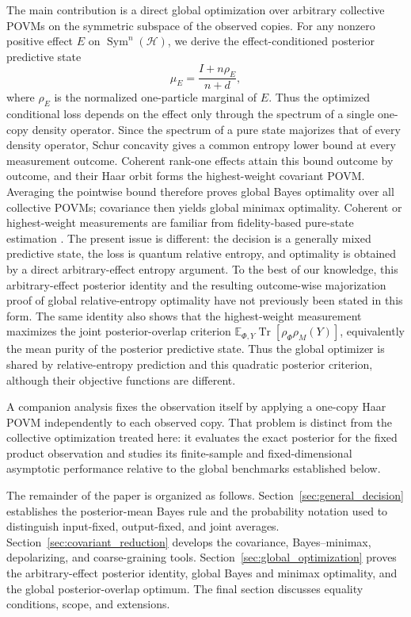 \documentclass[journal]{IEEEtran}
\begin{document}
The main contribution is a direct global optimization over arbitrary collective
POVMs on the symmetric subspace of the observed copies.  For any nonzero
positive effect \(E\) on \(\operatorname{Sym}^n(\mathcal H)\), we derive the
effect-conditioned posterior predictive state
\[
    \mu_E=\frac{I+n\rho_E}{n+d},
\]
where \(\rho_E\) is the normalized one-particle marginal of \(E\).  Thus the
optimized conditional loss depends on the effect only through the spectrum of
a single one-copy density operator.  Since the spectrum of a pure state
majorizes that of every density operator, Schur concavity gives a common entropy
lower bound at every measurement outcome.  Coherent rank-one effects attain
this bound outcome by outcome, and their Haar orbit forms the highest-weight
covariant POVM.  Averaging the pointwise bound therefore proves global Bayes
optimality over all collective POVMs; covariance then yields global minimax
optimality.  Coherent or highest-weight measurements are familiar from
fidelity-based pure-state estimation
\cite{MassarPopescu1995OptimalEstimation,DerkaBuzekEkert1998OptimalEstimation,Hayashi1998PureStateEstimation,Group2}.
The present issue is different: the decision is a generally mixed predictive
state, the loss is quantum relative entropy, and optimality is obtained by a
direct arbitrary-effect entropy argument.  To the best of our knowledge, this
arbitrary-effect posterior identity and the resulting outcome-wise
majorization proof of global relative-entropy optimality have not previously
been stated in this form.  The same identity also shows that the highest-weight
measurement maximizes the joint posterior-overlap criterion
\(\mathbb E_{\Phi,Y}\operatorname{Tr}[\rho_\Phi\rho_M(Y)]\), equivalently the mean
purity of the posterior predictive state.  Thus the global optimizer is shared
by relative-entropy prediction and this quadratic posterior criterion, although
their objective functions are different.

A companion analysis fixes the observation itself by applying a one-copy Haar
POVM independently to each observed copy.  That problem is distinct from the
collective optimization treated here: it evaluates the exact posterior for the
fixed product observation and studies its finite-sample and fixed-dimensional
asymptotic performance relative to the global benchmarks established below.

The remainder of the paper is organized as follows.
Section~\ref{sec:general_decision} establishes the posterior-mean Bayes rule and
the probability notation used to distinguish input-fixed, output-fixed, and
joint averages.  Section~\ref{sec:covariant_reduction} develops the covariance,
Bayes--minimax, depolarizing, and coarse-graining tools.  Section~\ref{sec:global_optimization}
proves the arbitrary-effect posterior identity, global Bayes and minimax
optimality, and the global posterior-overlap optimum.  The final section
discusses equality conditions, scope, and extensions.
\end{document}
